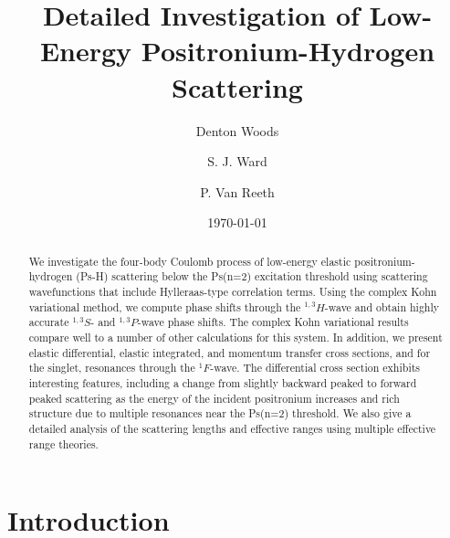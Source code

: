\documentclass[preprint,showpacs,showkeys,preprintnumbers,amsmath,amssymb,longbibliography,pra,aps]{revtex4-1}
\begin{document}

\title{Detailed Investigation of Low-Energy Positronium-Hydrogen Scattering}

\author{Denton Woods}

\author{S. J. Ward}

\author{P. Van Reeth}

\date{\today}

\begin{abstract}
We investigate the four-body Coulomb process of low-energy elastic
positronium-hydrogen (Ps-H) scattering below the Ps(n=2) excitation threshold
using scattering wavefunctions that include Hylleraas-type 
correlation terms. Using the complex Kohn variational method, we 
compute phase shifts through the $^{1,3}H$-wave and obtain highly accurate
$^{1,3}S$- and $^{1,3}P$-wave phase shifts. The complex
Kohn variational results compare well to a number of other calculations for 
this system. In addition, we present elastic 
differential, elastic integrated, and momentum transfer
cross sections, and for the singlet, resonances through the
$^1F$-wave. The differential cross section exhibits interesting features,
including a change from slightly backward peaked to
forward peaked scattering as the energy of the incident
positronium increases and
rich structure due to multiple resonances near the Ps(n=2) threshold.
We also give a detailed analysis of the scattering lengths
and effective ranges using multiple effective range theories.
\end{abstract}

   
\maketitle

\section{\label{sec:Intro}\protect Introduction}
\end{document}
